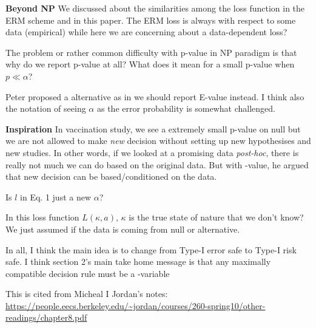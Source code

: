 \textbf{Beyond NP} \quad We discussed about the similarities among the loss function in the ERM scheme
and in this paper. The ERM loss is always with respect to some data (empirical) while
here we are concerning about a data-dependent loss?

The problem or rather common difficulty with p-value in NP paradigm is that
why do we report p-value at all?
What does it mean for a small p-value when $p\ll\alpha$?

Peter proposed a alternative as in we should report E-value instead.
I think also the notation of seeing $\alpha$ as the error probability is somewhat challenged.

\textbf{Inspiration} \quad In vaccination study, we see a extremely small p-value on null
but we are not allowed to make \emph{new} decision without setting up new hypothesises and
new studies. In other words, if we looked at a promising data \emph{post-hoc},
there is really not much we can do based on the original data.
But with \E-value, he argued that new decision can be based/conditioned on the data.

Is $l$ in Eq. 1 \cite{grunwaldNeymanPearsonEvalues2024} just a new $\alpha$?

In this loss function $L(\kappa, a)$, $\kappa$ is the true state of nature that we don't know?
We just assumed if the data is coming from null or alternative.

In all, I think the main idea is to change from Type-I error safe to Type-I risk safe.
I think section 2's main take home message is that any maximally compatible decision rule must
be a \E-variable

This is cited from Micheal I Jordan's notes:
\url{https://people.eecs.berkeley.edu/~jordan/courses/260-spring10/other-readings/chapter8.pdf}


\clearpage